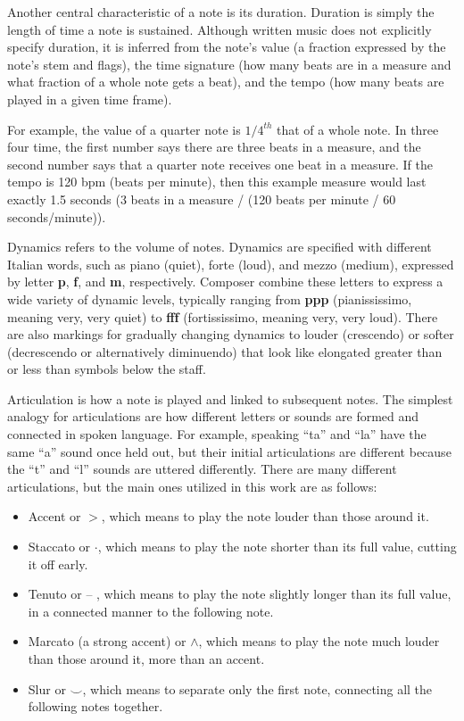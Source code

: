 \documentclass[12pt]{report}
\begin{document}
Another central characteristic of a note is its duration. Duration is simply the length of time a note is sustained. Although written music does not explicitly specify duration, it is inferred from the note's value (a fraction expressed by the note's stem and flags), the time signature (how many beats are in a measure and what fraction of a whole note gets a beat), and the tempo (how many beats are played in a given time frame).

For example, the value of a quarter note is $1/4^{th}$ that of a whole note. In three four time, the first number says there are three beats in a measure, and the second number says that a quarter note receives one beat in a measure. If the tempo is 120 bpm (beats per minute), then this example measure would last exactly 1.5 seconds (3 beats in a measure / (120 beats per minute / 60 seconds/minute)).

Dynamics refers to the volume of notes. Dynamics are specified with different Italian words, such as piano (quiet), forte (loud), and mezzo (medium), expressed by letter \textbf{p}, \textbf{f}, and \textbf{m}, respectively. Composer combine these letters to express a wide variety of dynamic levels, typically ranging from \textbf{ppp} (pianississimo, meaning very, very quiet) to \textbf{fff} (fortississimo, meaning very, very loud). There are also markings for gradually changing dynamics to louder (crescendo) or softer (decrescendo or alternatively diminuendo) that look like elongated greater than or less than symbols below the staff.

Articulation is how a note is played and linked to subsequent notes. The simplest analogy for articulations are how different letters or sounds are formed and connected in spoken language. For example, speaking ``ta'' and ``la'' have the same ``a'' sound once held out, but their initial articulations are different because the ``t'' and ``l'' sounds are uttered differently. There are many different articulations, but the main ones utilized in this work are as follows:

\begin{itemize}
\item Accent or $>$, which means to play the note louder than those around it.
\item Staccato or $\cdot$, which means to play the note shorter than its full value, cutting it off early.
\item Tenuto or -- , which means to play the note slightly longer than its full value, in a connected manner to the following note.
\item Marcato (a strong accent) or $\wedge$, which means to play the note much louder than those around it, more than an accent.
\item Slur or $\smile$, which means to separate only the first note, connecting all the following notes together.
\end{itemize}
\end{document}
